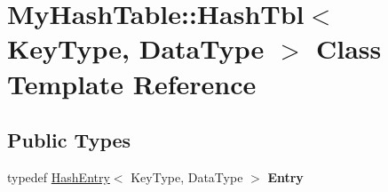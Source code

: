 \hypertarget{classMyHashTable_1_1HashTbl}{}\section{My\+Hash\+Table\+:\+:Hash\+Tbl$<$ Key\+Type, Data\+Type $>$ Class Template Reference}
\label{classMyHashTable_1_1HashTbl}
\subsection*{Public Types}
\begin{DoxyCompactItemize}
\item 
typedef \hyperlink{classMyHashTable_1_1HashEntry}{Hash\+Entry}$<$ Key\+Type, Data\+Type $>$ {\bfseries Entry}\hypertarget{classMyHashTable_1_1HashTbl_a080ff43587a10e6936ea52ee115f8836}{}\label{classMyHashTable_1_1HashTbl_a080ff43587a10e6936ea52ee115f8836}

\end{DoxyCompactItemize}
